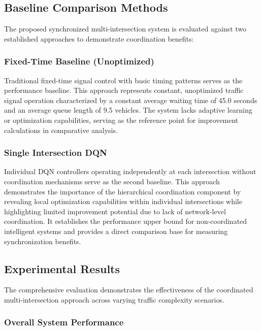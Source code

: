 \subsection{Baseline Comparison Methods}\label{subsec2b-3}

The proposed synchronized multi-intersection system is evaluated against two established approaches to demonstrate coordination benefits:

\subsubsection{Fixed-Time Baseline (Unoptimized)}

Traditional fixed-time signal control with basic timing patterns serves as the performance baseline. This approach represents constant, unoptimized traffic signal operation characterized by a constant average waiting time of 45.0 seconds and an average queue length of 9.5 vehicles. The system lacks adaptive learning or optimization capabilities, serving as the reference point for improvement calculations in comparative analysis.

\subsubsection{Single Intersection DQN}

Individual DQN controllers operating independently at each intersection without coordination mechanisms serve as the second baseline. This approach demonstrates the importance of the hierarchical coordination component by revealing local optimization capabilities within individual intersections while highlighting limited improvement potential due to lack of network-level coordination. It establishes the performance upper bound for non-coordinated intelligent systems and provides a direct comparison base for measuring synchronization benefits.

\subsection{Experimental Results}\label{subsec2b-4}

The comprehensive evaluation demonstrates the effectiveness of the coordinated multi-intersection approach across varying traffic complexity scenarios.

\subsubsection{Overall System Performance}


